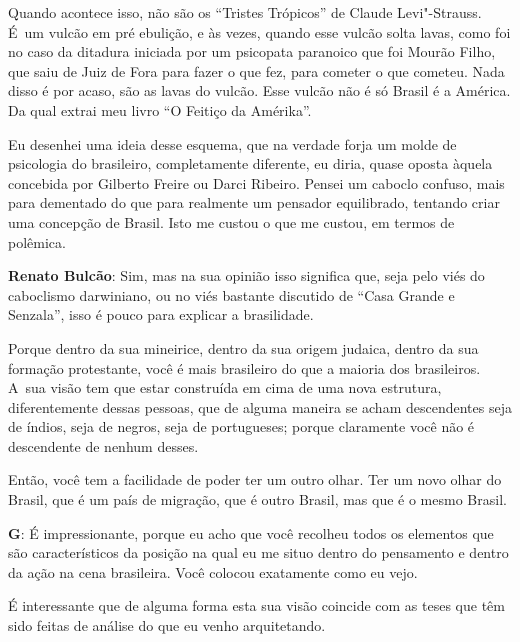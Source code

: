  

Quando acontece isso, não são os ``Tristes Trópicos'' de Claude
Levi"-Strauss. É~um vulcão em pré ebulição, e às vezes, quando esse vulcão
solta lavas, como foi no caso da ditadura iniciada por um psicopata
paranoico que foi Mourão Filho, que saiu de Juiz de Fora para fazer o
que fez, para cometer o que cometeu. Nada disso é por acaso, são as
lavas do vulcão. Esse vulcão não é só Brasil é a América. Da qual extrai
meu livro ``O Feitiço da Amérika''.

 

Eu desenhei uma ideia desse esquema, que na verdade forja um molde de
psicologia do brasileiro, completamente diferente, eu diria, quase
oposta àquela concebida por Gilberto Freire ou Darci Ribeiro. Pensei
um caboclo confuso, mais para dementado do que para realmente um
pensador equilibrado, tentando criar uma concepção de Brasil. Isto me
custou o que me custou, em termos de polêmica.

 

\textbf{Renato Bulcão}: Sim, mas na sua opinião isso significa que, seja
pelo viés do caboclismo darwiniano, ou no viés bastante discutido de
``Casa Grande e Senzala'', isso é pouco para explicar a brasilidade.

 

Porque dentro da sua mineirice, dentro da sua origem judaica, dentro da
sua formação protestante, você é mais brasileiro do que a maioria dos
brasileiros. A~sua visão tem que estar construída em cima de uma nova
estrutura, diferentemente dessas pessoas, que de alguma maneira se acham
descendentes seja de índios, seja de negros, seja de portugueses; porque
claramente você não é descendente de nenhum desses.

 

Então, você tem a facilidade de poder ter um outro olhar. Ter um novo
olhar do Brasil, que é um país de migração, que é outro Brasil, mas que é
o mesmo Brasil.

 

\textbf{G}: É impressionante, porque eu acho que você recolheu todos os
elementos que são característicos da posição na qual eu me situo dentro
do pensamento e dentro da ação na cena brasileira. Você colocou
exatamente como eu vejo.

 

É interessante que de alguma forma esta sua visão coincide com as teses
que têm sido feitas de análise do que eu venho arquitetando.

 

